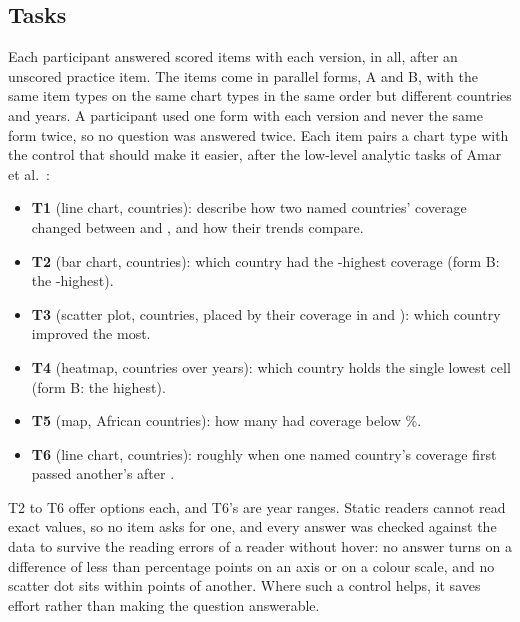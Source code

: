 \documentclass[10pt,twocolumn]{article}
\begin{document}
\subsection{Tasks}
\label{sec:tasks}

Each participant answered  scored items with each version,  in all, after an unscored practice item. The items come in  parallel forms, A and B, with the same item types on the same chart types in the same order but different countries and years. A participant used one form with each version and never the same form twice, so no question was answered twice. Each item pairs a chart type with the control that should make it easier, after the low-level analytic tasks of Amar et al.~\cite{amar2005}:

\begin{itemize}
    \item \textbf{T1} (line chart,  countries): describe how two named countries' coverage changed between  and , and how their trends compare.
    \item \textbf{T2} (bar chart,  countries): which country had the -highest coverage (form B: the -highest).
    \item \textbf{T3} (scatter plot,  countries, placed by their coverage in  and ): which country improved the most.
    \item \textbf{T4} (heatmap,  countries over  years): which country holds the single lowest cell (form B: the highest).
    \item \textbf{T5} (map,  African countries): how many had coverage below \%.
    \item \textbf{T6} (line chart,  countries): roughly when one named country's coverage first passed another's after .
\end{itemize}

T2 to T6 offer  options each, and T6's are year ranges. Static readers cannot read exact values, so no item asks for one, and every answer was checked against the data to survive the reading errors of a reader without hover: no answer turns on a difference of less than  percentage points on an axis or  on a colour scale, and no scatter dot sits within  points of another. Where such a control helps, it saves effort rather than making the question answerable.
\end{document}
